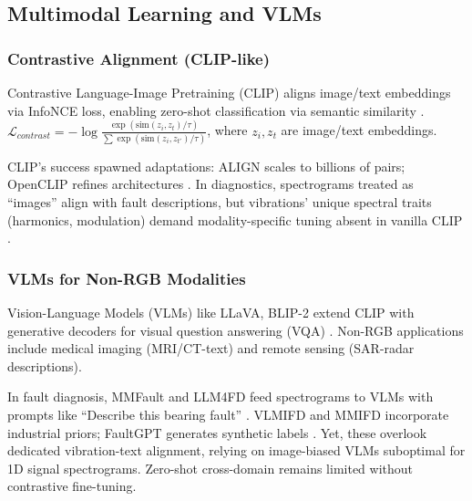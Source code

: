 \subsection{Multimodal Learning and VLMs}
\subsubsection{Contrastive Alignment (CLIP-like)}
Contrastive Language-Image Pretraining (CLIP) aligns image/text embeddings via InfoNCE loss, enabling zero-shot classification via semantic similarity \cite{radford2021clip}. $\mathcal{L}_{contrast} = -\log \frac{\exp(\mathrm{sim}(z_i, z_t)/\tau)}{\sum \exp(\mathrm{sim}(z_i, z_{t'})/\tau)}$, where $z_i, z_t$ are image/text embeddings.

CLIP's success spawned adaptations: ALIGN scales to billions of pairs; OpenCLIP refines architectures \cite{li2023align,jia2021scaling}. In diagnostics, spectrograms treated as ``images'' align with fault descriptions, but vibrations' unique spectral traits (harmonics, modulation) demand modality-specific tuning absent in vanilla CLIP \cite{kim2025llmzs}.

\subsubsection{VLMs for Non-RGB Modalities}
Vision-Language Models (VLMs) like LLaVA, BLIP-2 extend CLIP with generative decoders for visual question answering (VQA) \cite{liu2023llava}. Non-RGB applications include medical imaging (MRI/CT-text) and remote sensing (SAR-radar descriptions).

In fault diagnosis, MMFault and LLM4FD feed spectrograms to VLMs with prompts like ``Describe this bearing fault'' \cite{zhang2024mmfault,li2024llm4fd}. VLMIFD and MMIFD incorporate industrial priors; FaultGPT generates synthetic labels \cite{zhao2025vlmifd,xu2025mmifd,liu2024faultgpt}. Yet, these overlook dedicated vibration-text alignment, relying on image-biased VLMs suboptimal for 1D signal spectrograms. Zero-shot cross-domain remains limited without contrastive fine-tuning.

